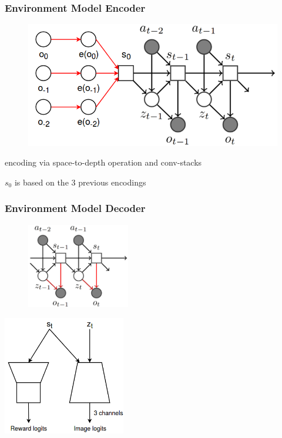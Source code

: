 \begin{frame}
	\frametitle{Environment Model Encoder}
	\begin{figure}[h]
		\includegraphics[width=0.8\textheight]{./latent_i2a_images/Encoder.png}	
	\end{figure}
	\begin{PraesentationAufzaehlung}
		\item encoding via space-to-depth operation and conv-stacks
		\item $s_0$ is based on the 3 previous encodings
	\end{PraesentationAufzaehlung}
\end{frame}

\begin{frame}
	\frametitle{Environment Model Decoder}
	\begin{multicols}{2}
		\begin{figure}[h]
			\includegraphics[width=0.4\textwidth]{./latent_i2a_images/sSSM2_decoder_marked.png}	
		\end{figure}
		\columnbreak
		\includegraphics[width=0.4\textwidth]{./latent_i2a_images/LatentSpaceDecoder.png}
	\end{multicols}
\end{frame}

